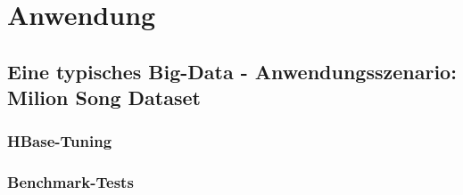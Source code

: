 \chapter{Anwendung}
\section{Eine typisches Big-Data -  Anwendungsszenario: Milion Song Dataset}





\subsection{HBase-Tuning}
\subsection{Benchmark-Tests}
